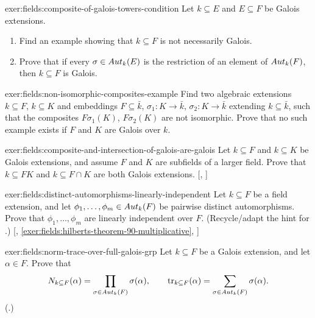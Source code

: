 \begin{exer}{}{exer:fields:composite-of-galois-towers-condition}
  Let $k \subseteq E$ and $E \subseteq F$ be Galois extensions.
  \begin{enumerate}[label=(\roman*)]
  \item Find an example showing that $k \subseteq F$ is not
    necessarily Galois.
  \item Prove that if every $\sigma \in Aut_k(E)$ is the restriction
    of an element of $Aut_k(F)$, then $k \subseteq F$ is Galois.
  \end{enumerate}
\end{exer}
\begin{exer}{}{exer:fields:non-isomorphic-composites-example}
  Find two algebraic extensions $k \subseteq F$, $k \subseteq K$ and
  embeddings $F \subseteq \bar{k}$, $\sigma_1 : K \to \bar{k}$,
  $\sigma_2 : K \to \bar{k}$ extending $k \subseteq \bar{k}$, such
  that the composites $F\sigma_1(K)$, $F\sigma_2(K)$ are not
  isomorphic.  Prove that no such example exists if $F$ and $K$ are
  Galois over $k$.
\end{exer}
\begin{exer}{}{exer:fields:composite-and-intersection-of-galois-are-galois}
  Let $k \subseteq F$ and $k \subseteq K$ be Galois extensions, and
  assume $F$ and $K$ are subfields of a larger field. Prove that
  $k \subseteq FK$ and $k \subseteq F \cap K$ are both Galois
  extensions. [,
  ]
\end{exer}
\begin{exer}{}{exer:fields:distinct-automorphisms-linearly-independent}
  Let $k \subseteq F$ be a field extension, and let
  $\phi_1, \dots, \phi_m \in Aut_k(F)$ be pairwise distinct
  automorphisms. Prove that $\phi_1, \dots, \phi_m$ are linearly
  independent over $F$. (Recycle/adapt the hint for
  .)
  [,
  \ref{exer:fields:hilberts-theorem-90-multiplicative},
  ]
\end{exer}
\begin{exer}{}{exer:fields:norm-trace-over-full-galois-grp}
  Let $k \subseteq F$ be a Galois extension, and let $\alpha \in
  F$. Prove that
  \[
    N_{k \subseteq F}(\alpha) = \prod_{\sigma \in Aut_k(F)}
    \sigma(\alpha), \qquad \mathrm{tr}_{k \subseteq F}(\alpha) =
    \sum_{\sigma \in Aut_k(F)} \sigma(\alpha).
  \]
  (.)
\end{exer}
